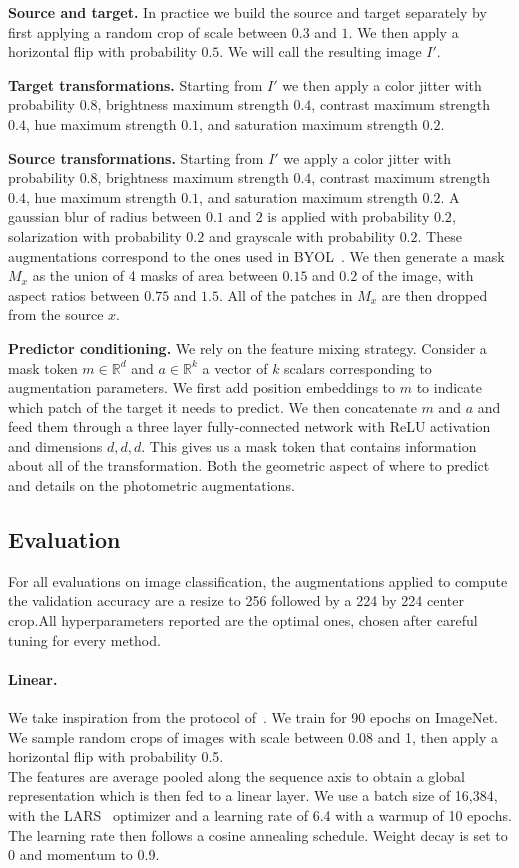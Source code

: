 \documentclass[twocolumn]{fairmeta}
\theoremstyle{plain}
\theoremstyle{definition}
\theoremstyle{remark}
\begin{document}
\textbf{Source and target.}
In practice we build the source and target separately by first applying a random crop of scale between $0.3$ and $1$. We then apply a horizontal flip with probability $0.5$. We will call the resulting image $I'$.

\textbf{Target transformations.}
Starting from $I'$ we then apply a color jitter with probability $0.8$, brightness maximum strength $0.4$, contrast maximum strength $0.4$, hue maximum strength $0.1$, and saturation maximum strength $0.2$.

\textbf{Source transformations.}
Starting from $I'$ we apply a color jitter with probability $0.8$, brightness maximum strength $0.4$, contrast maximum strength $0.4$, hue maximum strength $0.1$, and saturation maximum strength $0.2$. A gaussian blur of radius between $0.1$ and $2$ is applied with probability $0.2$, solarization with probability $0.2$ and grayscale with probability $0.2$. These augmentations correspond to the ones used in BYOL~\citep{grill2020byol}.
We then generate a mask $M_x$ as the union of 4 masks of area between $0.15$ and $0.2$ of the image, with aspect ratios between $0.75$ and $1.5$. All of the patches in $M_x$ are then dropped from the source $x$.

\textbf{Predictor conditioning.}
We rely on the feature mixing strategy. Consider a mask token $m\in \mathbb{R}^d$ and $a \in \mathbb{R}^k$ a vector of $k$ scalars corresponding to augmentation parameters. We first add position embeddings to $m$ to indicate which patch of the target it needs to predict. We then concatenate $m$ and $a$ and feed them through a three layer fully-connected network with ReLU activation and dimensions $d,d,d$.  This gives us a mask token that contains information about all of the transformation. Both the geometric aspect of where to predict and details on the photometric augmentations.



\subsection{Evaluation}

For all evaluations on image classification, the augmentations applied to compute the validation accuracy are a resize to 256 followed by a 224 by 224 center crop.All hyperparameters reported are the optimal ones, chosen after careful tuning for every method.

\paragraph{Linear.}
We take inspiration from the protocol of~\cite{chen2021mocov3}. We train for 90 epochs on ImageNet. We sample random crops of images with scale between 0.08 and 1, then apply a horizontal flip with probability 0.5.\\
The features are average pooled along the sequence axis to obtain a global representation which is then fed to a linear layer.
We use a batch size of 16,384, with the LARS~\citep{you2017lars} optimizer and a learning rate of 6.4  with a warmup of 10 epochs. The learning rate then follows a cosine annealing schedule. Weight decay is set to 0 and momentum to 0.9.
\end{document}
